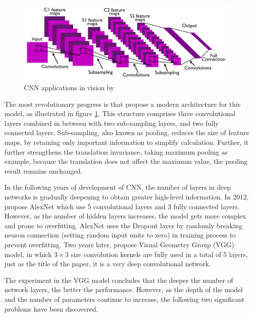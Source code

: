 \begin{figure}[ht!]
    \centering
    \includegraphics[width=\textwidth]{literature/imgs/ext-lecun-cnn-arch.png}
    \caption{CNN applications in vision by \citet{lecun2010convolutional}}
    \label{fig:ext-lecun-cnn-arch}
\end{figure}

The most revolutionary progress is that \citet{lecun2010convolutional} propose a modern architecture for this model, as illustrated in figure \ref{fig:ext-lecun-cnn-arch}.
This structure comprises three convolutional layers combined in between with two sub-sampling layers, and two fully connected layers. Sub-sampling, also known as pooling, reduces the size of feature maps, by retaining only important information to simplify calculation.
Further, it further strengthens the translation invariance, taking maximum pooling as example, because the translation does not affect the maximum value, the pooling result remains unchanged.

In the following years of development of CNN, the number of layers in deep networks is gradually deepening to obtain greater high-level information.
In 2012, \citet{krizhevsky2012imagenet} propose AlexNet which use 5 convolutional layers and 3 fully connected layers.
However, as the number of hidden layers increases, the model gets more complex and prone to overfitting.
AlexNet uses the Dropout layer by randomly breaking neuron connection (setting random input units to zero) in training process to prevent overfitting. 
Two years later, \citet{simonyan2014very} propose Visual Geometry Group (VGG) model, in which $3\times3$ size convolution kernels are fully used in a total of 5 layers, just as the title of the paper, it is a very deep convolutional network.

The experiment in the VGG model concludes that the deeper the number of network layers, the better the performance.
However, as the depth of the model and the number of parameters continue to increase, the following two significant problems have been discovered.

